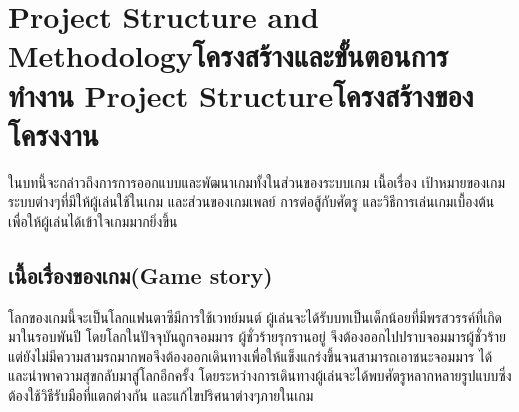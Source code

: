 \chapter{\ifproject%
\ifenglish Project Structure and Methodology\else โครงสร้างและขั้นตอนการทำงาน\fi
\else%
\ifenglish Project Structure\else โครงสร้างของโครงงาน\fi
\fi
}

\enskip \enskip \enskip \enskip \enskip ในบทนี้จะกล่าวถึงการการออกแบบและพัฒนาเกมทั้งในส่วนของระบบเกม เนื้อเรื่อง เป้าหมายของเกม ระบบต่างๆที่มีให้ผู้เล่นใช้ในเกม 
และส่วนของเกมเพลย์ การต่อสู้กับศัตรู และวิธีการเล่นเกมเบื้องต้น เพื่อให้ผู้เล่นได้เข้าใจเกมมากยิ่งขึ้น


\makeatletter


\makeatother

\section{เนื้อเรื่องของเกม(Game story)}
\enskip \enskip \enskip \enskip \enskip โลกของเกมนี้จะเป็นโลกแฟนตาซีมีการใช้เวทย์มนต์ ผู้เล่นจะได้รับบทเป็นเด็กน้อยที่มีพรสวรรค์ที่เกิดมาในรอบพันปี โดยโลกในปัจจุบันถูกจอมมาร
ผู้ชั่วร้ายรุกรานอยู่ จึงต้องออกไปปราบจอมมารผู้ชั่วร้าย แต่ยังไม่มีความสามรถมากพอจึงต้องออกเดินทางเพื่อให้แข็งแกร่งขึ้นจนสามารถเอาชนะจอมมาร
ได้และนำพาความสุขกลับมาสู่โลกอีกครั้ง โดยระหว่างการเดินทางผู้เล่นจะได้พบศัตรูหลากหลายรูปแบบซึ่งต้องใช้วิธีรับมือที่แตกต่างกัน 
และแก้ไขปริศนาต่างๆภายในเกม

